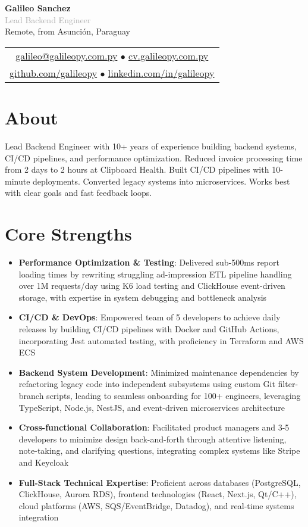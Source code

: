 \documentclass[11pt,a4paper]{article}
\newcommand{\cvheader}[5]{
  \begin{center}
    {\LARGE \textbf{#1}}\\[0.1em]
    {\large \textcolor{darkgray}{#2}}\\[0.1em]
    
    \textcolor{mediumgray}{#3}\\[0.1em]
    
    \begin{tabular}{c}
      \href{mailto:#4}{#4} $\bullet$ \href{https://#5}{#5}\\[0.1em]
      \href{https://github.com/galileopy}{github.com/galileopy} $\bullet$ 
      \href{https://www.linkedin.com/in/galileopy}{linkedin.com/in/galileopy}
    \end{tabular}
  \end{center}
}
\begin{document}
\cvheader{Galileo Sanchez}{Lead Backend Engineer}{Remote, from Asunción, Paraguay}{galileo@galileopy.com.py}{cv.galileopy.com.py}

\section{About}
Lead Backend Engineer with 10+ years of experience building backend systems, CI/CD pipelines, and performance optimization. Reduced invoice processing time from 2 days to 2 hours at Clipboard Health. Built CI/CD pipelines with 10-minute deployments. Converted legacy systems into microservices. Works best with clear goals and fast feedback loops.

\section{Core Strengths}

\begin{itemize}
\item \textbf{Performance Optimization \& Testing}: Delivered sub-500ms report loading times by rewriting struggling ad-impression ETL pipeline handling over 1M requests/day using K6 load testing and ClickHouse event-driven storage, with expertise in system debugging and bottleneck analysis
\item \textbf{CI/CD \& DevOps}: Empowered team of 5 developers to achieve daily releases by building CI/CD pipelines with Docker and GitHub Actions, incorporating Jest automated testing, with proficiency in Terraform and AWS ECS
\item \textbf{Backend System Development}: Minimized maintenance dependencies by refactoring legacy code into independent subsystems using custom Git filter-branch scripts, leading to seamless onboarding for 100+ engineers, leveraging TypeScript, Node.js, NestJS, and event-driven microservices architecture
\item \textbf{Cross-functional Collaboration}: Facilitated product managers and 3-5 developers to minimize design back-and-forth through attentive listening, note-taking, and clarifying questions, integrating complex systems like Stripe and Keycloak
\item \textbf{Full-Stack Technical Expertise}: Proficient across databases (PostgreSQL, ClickHouse, Aurora RDS), frontend technologies (React, Next.js, Qt/C++), cloud platforms (AWS, SQS/EventBridge, Datadog), and real-time systems integration
\end{itemize}
\end{document}
